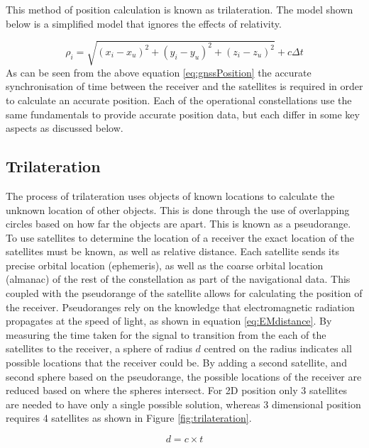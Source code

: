 This method of position calculation is known as trilateration. The model shown below is a simplified model that ignores the effects of relativity. 

\begin{equation} \label{eq:gnssPosition} 
    \rho_i = \sqrt{(x_i - x_u)^2 + (y_i - y_u)^2 + (z_i - z_u)^2} + c \Delta t
\end{equation}
As can be seen from the above equation \ref{eq:gnssPosition} the accurate synchronisation of time between the receiver and the satellites is required in order to
calculate an accurate position. 
Each of the operational constellations use the same fundamentals to provide accurate position data, but each differ in some key aspects as discussed below.

\subsection{Trilateration} \label{subsec:Trilateration}
The process of trilateration uses objects of known locations to calculate the unknown location of other objects. This is done through the use of overlapping circles based
on how far the objects are apart. This is known as a pseudorange. To use satellites to determine the location of a receiver the exact location of the satellites must be
known, as well as relative distance. Each satellite sends its precise orbital location (ephemeris), as well as the coarse orbital location (almanac) of the rest of the
constellation as part of the navigational data. This coupled with the pseudorange of the satellite allows for calculating the position of the receiver. Pseudoranges rely
on the knowledge that electromagnetic radiation propagates at the speed of light, as shown in equation \ref{eq:EMdistance}. By measuring the time taken for the signal to
transition from the each of the satellites to the receiver, a sphere of radius $d$ centred on the radius indicates all possible locations that the receiver could be. By
adding a second satellite, and second sphere based on the pseudorange, the possible locations of the receiver are reduced based on where the spheres intersect. For 2D
position only 3 satellites are needed to have only a single possible solution, whereas 3 dimensional position requires 4 satellites as shown in Figure
\ref{fig:trilateration}.

\begin{equation} \label{eq:EMdistance}
    d = c \times t
\end{equation}

